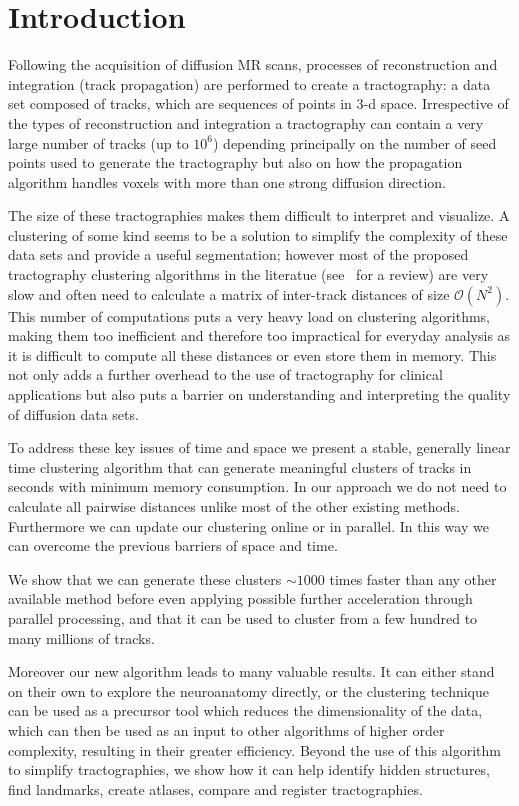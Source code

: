 \documentclass[preprint,authoryear,a4paper,10pt,onecolumn]{elsarticle}
\begin{document}
\section{Introduction}

Following the acquisition of diffusion MR scans, processes of
reconstruction and integration (track propagation) are performed to
create a tractography: a data set composed of tracks, which are
sequences of points in 3-d space. Irrespective of the types of
reconstruction and integration a tractography can contain a very large
number of tracks (up to $10^6$) depending principally on the number of
seed points used to generate the tractography but also on how the
propagation algorithm handles voxels with more than one strong diffusion
direction.

The size of these tractographies makes them difficult to interpret and
visualize. A clustering of some kind seems to be a solution to simplify
the complexity of these data sets and provide a useful segmentation;
however most of the proposed tractography clustering algorithms in the
literatue (see~\citet{Garyfallidis_thesis} for a review) are very slow
and often need to calculate a matrix of inter-track distances of size
$\mathcal{O}(N^2)$. This number of computations puts a very heavy load
on clustering algorithms, making them too inefficient and therefore too
impractical for everyday analysis as it is difficult to compute all
these distances or even store them in memory. This not only adds a
further overhead to the use of tractography for clinical applications
but also puts a barrier on understanding and interpreting the quality of
diffusion data sets.

To address these key issues of time and space we present a stable,
generally linear time clustering algorithm that can generate meaningful
clusters of tracks in seconds with minimum memory consumption. In our
approach we do not need to calculate all pairwise distances unlike most
of the other existing methods. Furthermore we can update our clustering
online or in parallel. In this way we can overcome the previous barriers
of space and time.

We show that we can generate these clusters $\sim1000$ times faster than
any other available method before even applying possible further
acceleration through parallel processing, and that it can be used to
cluster from a few hundred to many millions of tracks.

Moreover our new algorithm leads to many valuable results. It can either stand on
their own to explore the neuroanatomy directly, or the clustering
technique can be used as a precursor tool which reduces the
dimensionality of the data, which can then be used as an input to other
algorithms of higher order complexity, resulting in their greater
efficiency. Beyond the use of this algorithm to simplify tractographies,
we show how it can help identify hidden structures, find landmarks,
create atlases, compare and register tractographies.
\end{document}
